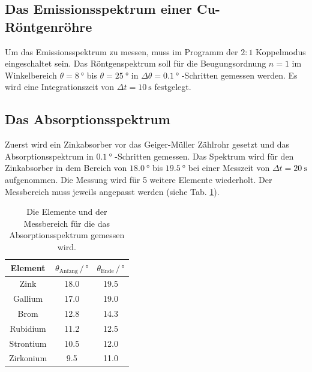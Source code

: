 \subsection{Das Emissionsspektrum einer Cu-Röntgenröhre}
Um das Emissionsspektrum zu messen, muss im Programm der $2:1$ Koppelmodus eingeschaltet sein.
Das Röntgenspektrum soll für die Beugungsordnung $n=1$ im Winkelbereich $\theta = \SI{8}{\degree}$ bis $\theta = \SI{25}{\degree}$ in $\Delta \theta = \SI{0.1}{\degree}$ -Schritten gemessen werden.
Es wird eine Integrationszeit von $\Delta t = \SI{10}{\second}$ festgelegt.

\subsection{Das Absorptionsspektrum}
Zuerst wird ein Zinkabsorber vor das Geiger-Müller Zählrohr gesetzt und das Absorptionsspektrum in $\SI{0.1}{\degree}$ -Schritten gemessen.
Das Spektrum wird für den Zinkabsorber in dem Bereich von $\SI{18.0}{\degree}$ bis $\SI{19.5}{\degree}$ bei einer Messzeit von $\Delta t = \SI{20}{\second}$ aufgenommen.
Die Messung wird für 5 weitere Elemente wiederholt.
Der Messbereich muss jeweils angepasst werden (siehe Tab. \ref{tab:messzeit}).
\begin{table}
    \centering
    \begin{tabular}{c|cc}
    \toprule
    Element & $\theta_\text{Anfang} \,/\, \si{\degree}$ & $\theta_\text{Ende} \,/\, \si{\degree}$ \\
    \midrule
    Zink & 18.0 & 19.5 \\
    Gallium & 17.0 & 19.0 \\
    Brom & 12.8 & 14.3 \\
    Rubidium & 11.2 & 12.5 \\
    Strontium & 10.5 & 12.0 \\
    Zirkonium & 9.5 & 11.0 \\
    \bottomrule
    \end{tabular}
    \caption{Die Elemente und der Messbereich für die das Absorptionsspektrum gemessen wird.}
    \label{tab:messzeit}
\end{table}